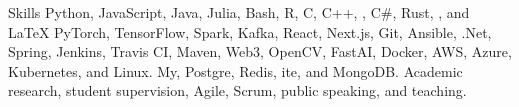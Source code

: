 
\begin{rubric}{Skills}
	Python, JavaScript, Java, Julia, Bash, R, C, C++, , C\#, Rust, , and \LaTeX
{}
	PyTorch, TensorFlow, Spark, Kafka, React, Next.js, Git, Ansible, .Net, Spring, Jenkins, Travis CI, Maven, Web3, OpenCV, FastAI, Docker, AWS, Azure, Kubernetes, and Linux.
\entry*[Databases]
	My, Postgre, Redis, ite, and MongoDB.
\entry*[Misc.]
	Academic research, student supervision, Agile, Scrum, public speaking, and teaching.
\end{rubric}
